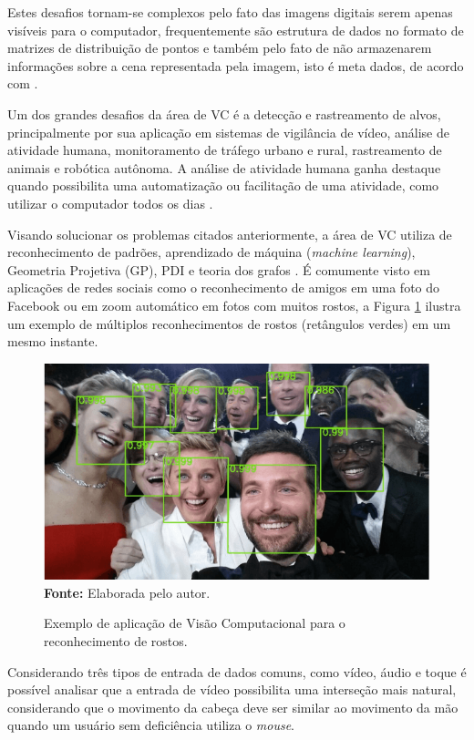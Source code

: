 Estes desafios tornam-se complexos pelo fato das imagens digitais serem apenas visíveis para o computador, frequentemente são estrutura de dados no formato de matrizes de distribuição de pontos e também pelo fato de não armazenarem informações sobre a cena representada pela imagem, isto é meta dados, de acordo com .

Um dos grandes desafios da área de VC é a detecção e rastreamento de alvos, principalmente por sua aplicação em sistemas de vigilância de vídeo, análise de atividade humana, monitoramento de tráfego urbano e rural, rastreamento de animais e robótica autônoma. A análise de atividade humana ganha destaque quando possibilita uma automatização ou facilitação de uma atividade, como utilizar o computador todos os dias \cite{alaya2012multipeople-UPPERCASE}.

Visando solucionar os problemas citados anteriormente, a área de VC utiliza de reconhecimento de padrões, aprendizado de máquina (\textit{machine learning}), Geometria Projetiva (GP), PDI e teoria dos grafos \cite{prince2012computer}. É comumente visto em aplicações de redes sociais como o reconhecimento de amigos em uma foto do Facebook ou em zoom automático em fotos com muitos rostos, a Figura \ref{fig:exemplo-vc} ilustra um exemplo de múltiplos reconhecimentos de rostos (retângulos verdes) em um mesmo instante.

\begin{figure}[htbp]
\caption{Exemplo de aplicação de Visão Computacional para o reconhecimento de rostos.}
 \centering \includegraphics[scale=1]{img/figura-1.png}
 \textbf{Fonte:} Elaborada pelo autor.
\label{fig:exemplo-vc}
\end{figure}

Considerando três tipos de entrada de dados comuns, como vídeo, áudio e toque é possível analisar que a entrada de vídeo possibilita uma interseção mais natural, considerando que o movimento da cabeça deve ser similar ao movimento da mão quando um usuário sem deficiência utiliza o \textit{mouse}.

